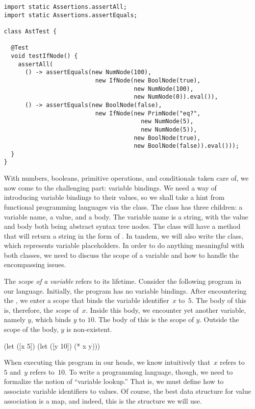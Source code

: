 \begin{lstlisting}[language=MyJava]
import static Assertions.assertAll;
import static Assertions.assertEquals;

class AstTest {
  
  @Test
  void testIfNode() {
    assertAll(
      () -> assertEquals(new NumNode(100),
                          new IfNode(new BoolNode(true),
                                     new NumNode(100),
                                     new NumNode(0)).eval()),
      () -> assertEquals(new BoolNode(false),
                          new IfNode(new PrimNode("eq?", 
                                       new NumNode(5), 
                                       new NumNode(5)),
                                     new BoolNode(true),
                                     new BoolNode(false)).eval()));
  }
}  
\end{lstlisting}

With numbers, booleans, primitive operations, and conditionals taken care of, we now come to the challenging part: variable bindings. 
We need a way of introducing variable bindings to their values, so we shall take a hint from functional programming languages via the  class. 
The  class has three children: a variable name, a value, and a body. 
The variable name is a string, with the value and body both being abstract syntax tree nodes. 
The  class will have a  method that will return a string in the form of . 
In tandem, we will also write the  class, which represents variable placeholders. In order to do anything meaningful with both classes, we need to discuss the scope of a variable and how to handle the encompassing issues.

The \emph{scope of a variable} refers to its lifetime.
Consider the following program in our language. Initially, the program has no variable bindings. 
After encountering the , we enter a scope that binds the variable identifier~$x$ to~$5$. 
The body of this  is, therefore, the \emph{scope} of~$x$. 
Inside this body, we encounter yet another variable, namely $y$, which binds $y$ to $10$. 
The body of this  is the scope of $y$. Outside the scope of the body, $y$ is non-existent.
\begin{verbnobox}[\small]
(let ([x 5])
  (let ([y 10])
    (* x y)))
\end{verbnobox}
When executing this program in our heads, we know intuitively that~$x$ refers to~$5$ and~$y$ refers to~$10$. 
To write a programming language, though, we need to formalize the notion of ``variable lookup.'' That is, we must define how to associate variable identifiers to values. 
Of course, the best data structure for value association is a map, and indeed, this is the structure we will use.

